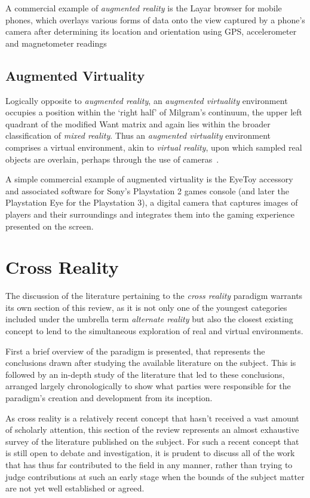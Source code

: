 A commercial example of \textit{augmented reality} is the Layar browser for mobile phones, which overlays various forms of data onto the view captured by a phone's camera after determining its location and orientation using GPS, accelerometer and magnetometer readings~\cite{eishita:layar}


\subsection{Augmented Virtuality}
Logically opposite to \textit{augmented reality}, an \textit{augmented virtuality} environment occupies a position within the `right half' of Milgram's continuum, the upper left quadrant of the modified Want matrix and again lies within the broader classification of \textit{mixed reality}. Thus an \textit{augmented virtuality} environment comprises a virtual environment, akin to \textit{virtual reality}, upon which sampled real objects are overlain, perhaps through the use of cameras~\cite{caballero:behand}.

A simple commercial example of augmented virtuality is the EyeToy accessory and associated software for Sony's Playstation 2 games console (and later the Playstation Eye for the Playstation 3), a digital camera that captures images of players and their surroundings and integrates them into the gaming experience presented on the screen.

\section{Cross Reality}
\label{sec:cross_reality}
The discussion of the literature pertaining to the \textit{cross reality} paradigm warrants its own section of this review, as it is not only one of the youngest categories included under the umbrella term \textit{alternate reality} but also the closest existing concept to lend to the simultaneous exploration of real and virtual environments.

First a brief overview of the paradigm is presented, that represents the conclusions drawn after studying the available literature on the subject. This is followed by an in-depth study of the literature that led to these conclusions, arranged largely chronologically to show what parties were responsible for the paradigm's creation and development from its inception.

As cross reality is a relatively recent concept that hasn't received a vast amount of scholarly attention, this section of the review represents an almost exhaustive survey of the literature published on the subject. For such a recent concept that is still open to debate and investigation, it is prudent to discuss all of the work that has thus far contributed to the field in any manner, rather than trying to judge contributions at such an early stage when the bounds of the subject matter are not yet well established or agreed.


